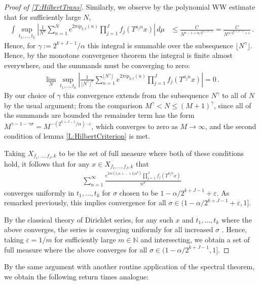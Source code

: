 \documentclass[11pt, oneside]{amsart}   	%
\newcommand{\ep}{\varepsilon}
\newcommand{\1}{\mathbbm{1}}
\newcommand{\N}{\mathbb{N}}
\newcommand{\floor}[1]{\lfloor#1\rfloor}
\theoremstyle{definition}
\begin{document}
\begin{proof}[Proof of \ref{T:HilbertTrans}]
Similarly, we observe by the polynomial WW estimate that for sufficiently large $N$, 
\begin{align*}
\int \sup_{t_1, \dots, t_k} \left| \frac{1}{N^\sigma} \sum_{n=1}^N e^{2\pi i p_{k, t}(n)} \prod_{j=1}^{J} f_j(T^{a_jn}x)\right| \, d\mu & \leq \frac{C}{N^{\sigma -1 + \alpha/2^{k+J-1}}} = \frac{C}{N^{\alpha/2^{k+J-1} + \ep}} \, .
\end{align*}
Hence, for $\gamma := 2^{k+J-1}/\alpha$ this integral is summable over the subsequence $\floor{N^\gamma}$. Hence, by the monotone convergence theorem the integral is finite almost everywhere, and the summands must be converging to zero:
\begin{align*}
\lim_N \sup_{t_1, \dots, t_k}\left|\frac{1}{\floor{N^\gamma}^\sigma} \sum_{n=1}^{\floor{N^\gamma}}e^{2\pi i p_{k, t}(n)} \prod_{j=1}^J f_j(T^{a_j n} x)\right| =0 \, .
\end{align*}
By our choice of $\gamma$ this convergence extends from the subsequence $N^\gamma$ to all of $N$ by the usual argument; from the comparison $M^\gamma < N \leq (M+1)^\gamma$, since all of the summands are bounded the remainder term has the form $M^{\gamma - 1 - \gamma \sigma} = M^{-(2^{k+J-1}/\alpha)\cdot \ep} $, which converges to zero as $M\to \infty$, and the second condition of lemma \ref{L:HilbertCriterion} is met.

Taking $X_{f_1, \dots, f_J, k}$ to be the set of full measure where both of these conditions hold, it follows that for any $x\in X_{f_1, \dots, f_J, k}$ that
\begin{align*}
\sum_{n=1}^\infty \frac{e^{2\pi i (t_1n + \dots + t_k n^k)} \prod_{j=1}^J f_j(T^{a_j n}x)}{n^\sigma}
\end{align*}
converges uniformly in $t_1, \dots, t_k$ for $\sigma$ chosen to be $1 - \alpha/2^{k+J-1} + \ep$. As remarked previously, this implies convergence for all $\sigma \in (1 - \alpha/2^{k+J-1} + \ep, 1]$. 

By the classical theory of Dirichlet series, for any such $x$ and $t_1, \dots, t_k$ where the above converges, the series is converging uniformly for all increased $\sigma$ \cite{Queffélec_Queffélec_2020}. Hence, taking $\ep = 1/m$ for sufficiently large $m\in \N$ and intersecting, we obtain a set of full measure where the above converges for all $\sigma \in (1 - \alpha/2^{k+J-1}, 1]$.

\end{proof}

By the same argument with another routine application of the spectral theorem, we obtain the following return times analogue:
\end{document}

